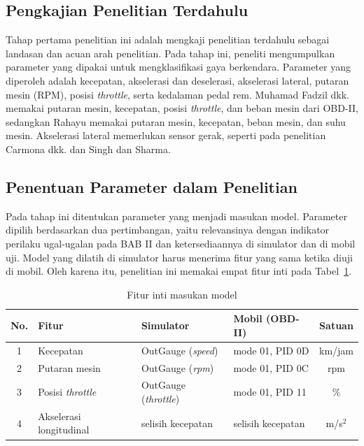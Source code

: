 \subsection{Pengkajian Penelitian Terdahulu}
Tahap pertama penelitian ini adalah mengkaji penelitian terdahulu sebagai landasan dan acuan arah penelitian. Pada tahap ini, peneliti mengumpulkan parameter yang dipakai untuk mengklasifikasi gaya berkendara. Parameter yang diperoleh adalah kecepatan, akselerasi dan deselerasi, akselerasi lateral, putaran mesin (RPM), posisi \textit{throttle}, serta kedalaman pedal rem. Muhamad Fadzil dkk. memakai putaran mesin, kecepatan, posisi \textit{throttle}, dan beban mesin dari OBD-II, sedangkan Rahayu memakai putaran mesin, kecepatan, beban mesin, dan suhu mesin. Akselerasi lateral memerlukan sensor gerak, seperti pada penelitian Carmona dkk. dan Singh dan Sharma.

\subsection{Penentuan Parameter dalam Penelitian}
Pada tahap ini ditentukan parameter yang menjadi masukan model. Parameter dipilih berdasarkan dua pertimbangan, yaitu relevansinya dengan indikator perilaku ugal-ugalan pada BAB II dan ketersediaannya di simulator dan di mobil uji. Model yang dilatih di simulator harus menerima fitur yang sama ketika diuji di mobil. Oleh karena itu, penelitian ini memakai empat fitur inti pada Tabel~\ref{tab:fitur}.

\begin{table}[H]
  \centering
  \caption{Fitur inti masukan model}
  \label{tab:fitur}
  \small
  \begin{tabular}{|c|l|l|l|c|}
    \hline
    \textbf{No.} & \textbf{Fitur} & \textbf{Simulator} & \textbf{Mobil (OBD-II)} & \textbf{Satuan} \\
    \hline
    1 & Kecepatan & OutGauge (\textit{speed}) & mode 01, PID 0D & km/jam \\
    \hline
    2 & Putaran mesin & OutGauge (\textit{rpm}) & mode 01, PID 0C & rpm \\
    \hline
    3 & Posisi \textit{throttle} & OutGauge (\textit{throttle}) & mode 01, PID 11 & \% \\
    \hline
    4 & Akselerasi longitudinal & selisih kecepatan & selisih kecepatan & m/s$^{2}$ \\
    \hline
  \end{tabular}
\end{table}

